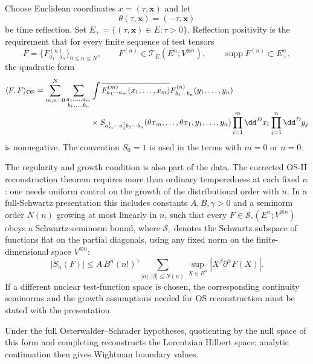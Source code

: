 \begin{definition}
  Choose Euclidean coordinates
  \(x=(\tau,\mathbf x)\) and let
  \[
    \theta(\tau,\mathbf x)=(-\tau,\mathbf x)
  \]
  be time reflection.  Set \(E_+=\{(\tau,\mathbf x)\in E:\tau>0\}\).  Reflection
  positivity is the requirement that for every finite sequence of test tensors
  \[
    F=\{F^{(n)}_{a_1\cdots a_n}\}_{0\leq n\leq N},
    \qquad
    F^{(n)}\in\mathcal T_E(E^n;V^{\otimes n}),
    \qquad
    \operatorname{supp}F^{(n)}
    \subset E_+^n,
  \]
  the quadratic form
  \[
  \begin{aligned}
    \langle F,F\rangle_{\rm OS}
    &=
    \sum_{m,n=0}^N
    \sum_{\substack{a_1,\ldots,a_m\\ b_1,\ldots,b_n}}
    \int
    \overline{F^{(m)}_{a_1\cdots a_m}(x_1,\ldots,x_m)}
    F^{(n)}_{b_1\cdots b_n}(y_1,\ldots,y_n)
    \\
    &\qquad\qquad\qquad\quad
    \times
    S_{a_m^\dagger\cdots a_1^\dagger b_1\cdots b_n}
    (\theta x_m,\ldots,\theta x_1,y_1,\ldots,y_n)
    \prod_{i=1}^m\dd^Dx_i\prod_{j=1}^n\dd^Dy_j
  \end{aligned}
  \]
  is nonnegative.  The convention \(S_0=1\) is used in the terms with
  \(m=0\) or \(n=0\).

  The regularity and growth condition is also part of the data.  The corrected
  OS-II reconstruction theorem requires more than ordinary temperedness at each
  fixed \(n\): one needs uniform control on the growth of the distributional
  order with \(n\).  In a full-Schwartz presentation this includes
  constants \(A,B,\gamma>0\) and a seminorm order \(N(n)\) growing at most
  linearly in \(n\), such that every
  \(F\in\mathcal S_\circ(E^n;V^{\otimes n})\) obeys a Schwartz-seminorm bound,
  where \(\mathcal S_\circ\) denotes the Schwartz subspace of functions flat on
  the partial diagonals,
  using any fixed norm on the finite-dimensional space \(V^{\otimes n}\):
  \[
    |S_n(F)|
    \le
    A\,B^n(n!)^\gamma
    \sum_{|\alpha|,|\beta|\le N(n)}
    \sup_{X\in E^n}
    \left|X^\beta\partial^\alpha F(X)\right|.
  \]
  If a different nuclear test-function space is chosen, the corresponding
  continuity seminorms and the growth assumptions needed for OS reconstruction
  must be stated with the presentation.

  Under the full Osterwalder--Schrader hypotheses,
  quotienting by the null space of this form and completing reconstructs the
  Lorentzian Hilbert space; analytic continuation then gives Wightman boundary
  values.
\end{definition}

